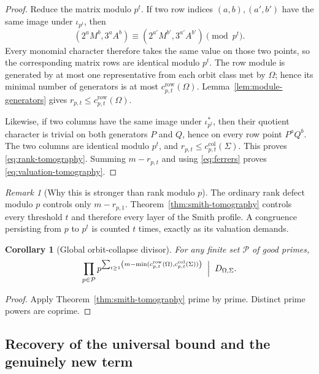 \documentclass[11pt]{article}
\newtheorem{corollary}[theorem]{Corollary}
\theoremstyle{definition}
\theoremstyle{remark}
\newtheorem{remark}[theorem]{Remark}
\newcommand{\crow}{c^{\mathrm{row}}}
\newcommand{\ccol}{c^{\mathrm{col}}}
\begin{document}
\begin{proof}
Reduce the matrix modulo $p^t$.  If two row indices $(a,b),(a',b')$ have the same image under $\iota_{p^t}$, then
\[
(2^aM^b,3^aA^b)\equiv
(2^{a'}M^{b'},3^{a'}A^{b'})\pmod{p^t}.
\]
Every monomial character therefore takes the same value on those two points, so the corresponding matrix rows are identical modulo $p^t$.  The row module is generated by at most one representative from each orbit class met by $\Omega$; hence its minimal number of generators is at most $\crow_{p,t}(\Omega)$.  Lemma~\ref{lem:module-generators} gives
$r_{p,t}\le\crow_{p,t}(\Omega)$.

Likewise, if two columns have the same image under $\iota^*_{p^t}$, then their quotient character is trivial on both generators $P$ and $Q$, hence on every row point $P^aQ^b$.  The two columns are identical modulo $p^t$, and
$r_{p,t}\le\ccol_{p,t}(\Sigma)$.  This proves \eqref{eq:rank-tomography}.  Summing $m-r_{p,t}$ and using \eqref{eq:ferrers} proves \eqref{eq:valuation-tomography}.
\end{proof}

\begin{remark}[Why this is stronger than rank modulo $p$]
The ordinary rank defect modulo $p$ controls only $m-r_{p,1}$.  Theorem~\ref{thm:smith-tomography} controls every threshold $t$ and therefore every layer of the Smith profile.  A congruence persisting from $p$ to $p^t$ is counted $t$ times, exactly as its valuation demands.
\end{remark}

\begin{corollary}[Global orbit-collapse divisor]\label{cor:global-orbit-divisor}
For any finite set $\mathcal P$ of good primes,
\begin{equation}\label{eq:global-orbit-divisor}
\prod_{p\in\mathcal P}
 p^{\sum_{t\ge1}
\left(m-\min(\crow_{p,t}(\Omega),\ccol_{p,t}(\Sigma))\right)}
\;\Bigm|\; D_{\Omega,\Sigma}.
\end{equation}
\end{corollary}

\begin{proof}
Apply Theorem~\ref{thm:smith-tomography} prime by prime.  Distinct prime powers are coprime.
\end{proof}

\subsection{Recovery of the universal bound and the genuinely new term}
\end{document}
